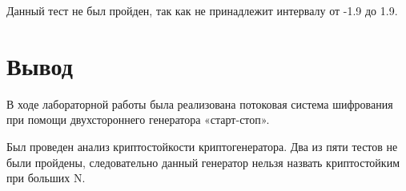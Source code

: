 \documentclass{article}
\begin{document}
\begin{enumerate}
Данный тест не был пройден, так как не принадлежит интервалу от -1.9 до 1.9. 

\end{enumerate}

\section{Вывод}

В ходе лабораторной работы была реализована потоковая система шифрования при помощи двухстороннего генератора «старт-стоп». 

Был проведен анализ криптостойкости криптогенератора. Два из пяти тестов не были пройдены, следовательно данный генератор нельзя назвать криптостойким при больших N.
\end{document}
